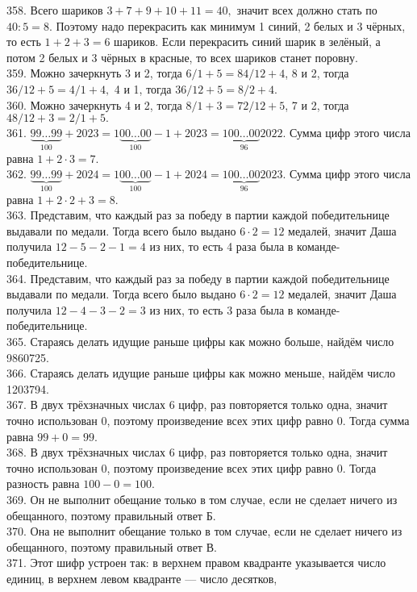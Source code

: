 358. Всего шариков $3+7+9+10+11=40,$ значит всех должно стать по $40:5=8.$ Поэтому надо перекрасить как минимум 1 синий, 2 белых и 3 чёрных, то есть $1+2+3=6$ шариков. Если перекрасить синий шарик в зелёный, а потом 2 белых и 3 чёрных в красные, то всех шариков станет поровну.\\
359. Можно зачеркнуть 3 и 2, тогда $6/1+5=84/12+4$, 8 и 2, тогда $36/12+5=4/1+4,$ 4 и 1, тогда $36/12+5=8/2+4.$\\
360. Можно зачеркнуть 4 и 2, тогда $8/1+3=72/12+5$, 7 и 2, тогда $48/12+3=2/1+5.$\\
361. $\underbrace{99\ldots99}_{100}+2023=1\underbrace{00\ldots00}_{100}-1+2023=1\underbrace{00\ldots00}_{96}2022.$ Сумма цифр этого числа равна $1+2\cdot3=7.$\\
362. $\underbrace{99\ldots99}_{100}+2024=1\underbrace{00\ldots00}_{100}-1+2024=1\underbrace{00\ldots00}_{96}2023.$ Сумма цифр этого числа равна $1+2\cdot2+3=8.$\\
363. Представим, что каждый раз за победу в партии каждой победительнице выдавали по медали. Тогда всего было выдано $6\cdot2=12$ медалей, значит Даша получила $12-5-2-1=4$ из них, то есть 4 раза была в команде-победительнице.\\
364. Представим, что каждый раз за победу в партии каждой победительнице выдавали по медали. Тогда всего было выдано $6\cdot2=12$ медалей, значит Даша получила $12-4-3-2=3$ из них, то есть 3 раза была в команде-победительнице.\\
365. Стараясь делать идущие раньше цифры как можно больше, найдём число 9860725.\\
366. Стараясь делать идущие раньше цифры как можно меньше, найдём число 1203794.\\
367. В двух трёхзначных числах 6 цифр, раз повторяется только одна, значит точно использован 0, поэтому произведение всех этих цифр равно 0. Тогда сумма равна $99+0=99.$\\
368. В двух трёхзначных числах 6 цифр, раз повторяется только одна, значит точно использован 0, поэтому произведение всех этих цифр равно 0. Тогда разность равна $100-0=100.$\\
369. Он не выполнит обещание только в том случае, если не сделает ничего из обещанного, поэтому правильный ответ Б.\\
370. Она не выполнит обещание только в том случае, если не сделает ничего из обещанного, поэтому правильный ответ В.\\
371. Этот шифр устроен так: в верхнем правом квадранте указывается число единиц, в верхнем левом квадранте --- число десятков,
